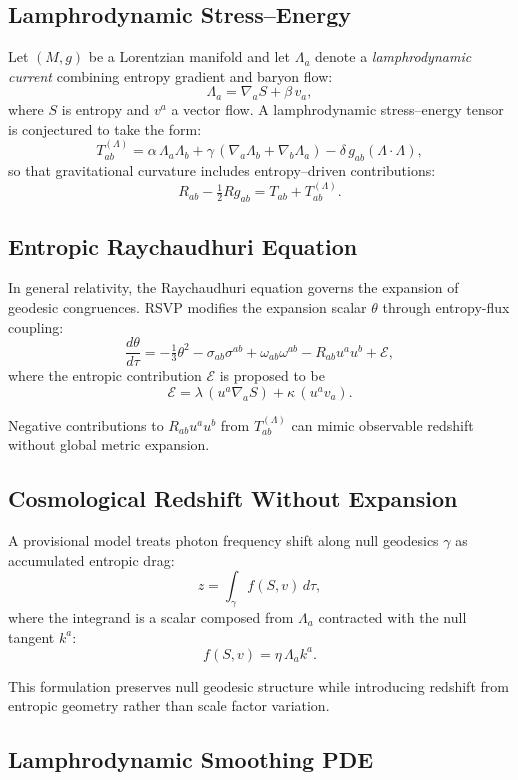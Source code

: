 \documentclass[12pt]{article}
\theoremstyle{plain}
\theoremstyle{definition}
\theoremstyle{remark}
\begin{document}
\subsection{Lamphrodynamic Stress--Energy}

Let $(M,g)$ be a Lorentzian manifold and let $\Lambda_a$ denote a
\emph{lamphrodynamic current} combining entropy gradient and baryon flow:
\[
    \Lambda_a = \nabla_a S + \beta\, v_a,
\]
where $S$ is entropy and $v^a$ a vector flow. A lamphrodynamic stress--energy
tensor is conjectured to take the form:
\[
    T^{(\Lambda)}_{ab} 
    = \alpha\,\Lambda_a\Lambda_b
    + \gamma\,(\nabla_a\Lambda_b + \nabla_b\Lambda_a)
    - \delta\,g_{ab}(\Lambda\cdot \Lambda),
\]
so that gravitational curvature includes entropy--driven contributions:
\[
    R_{ab} - \tfrac12 R g_{ab} = T_{ab} + T^{(\Lambda)}_{ab}.
\]


\subsection{Entropic Raychaudhuri Equation}

In general relativity, the Raychaudhuri equation governs the expansion of
geodesic congruences. RSVP modifies the expansion scalar $\theta$ through
entropy-flux coupling:
\[
    \frac{d\theta}{d\tau}
    = -\tfrac13\theta^2 - \sigma_{ab}\sigma^{ab}
    + \omega_{ab}\omega^{ab}
    - R_{ab}u^a u^b + \mathcal{E},
\]
where the entropic contribution $\mathcal{E}$ is proposed to be
\[
    \mathcal{E} = \lambda\, (u^a\nabla_a S) + \kappa\, (u^a v_a).
\]

Negative contributions to $R_{ab}u^a u^b$ from $T^{(\Lambda)}_{ab}$ can mimic
observable redshift without global metric expansion.


\subsection{Cosmological Redshift Without Expansion}

A provisional model treats photon frequency shift along null geodesics $\gamma$
as accumulated entropic drag:
\[
    z = \int_\gamma f(S,v)\, d\tau,
\]
where the integrand is a scalar composed from $\Lambda_a$ contracted with the
null tangent $k^a$:
\[
    f(S,v) = \eta\, \Lambda_a k^a.
\]

This formulation preserves null geodesic structure while introducing redshift
from entropic geometry rather than scale factor variation.


\subsection{Lamphrodynamic Smoothing PDE}
\end{document}
